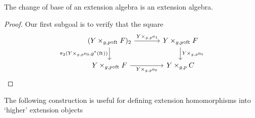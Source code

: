 \begin{thm}\label{cobesys-ext}
The change of base of an extension algebra is an extension algebra.
\end{thm}

\begin{proof}
Our first subgoal is to verify that the square
\begin{equation*}
\begin{tikzcd}[column sep=large]
(\pullback{Y}{\stesysf}{g}{p\circ\eft})_2
  \ar{r}{\cobesys{Y}{\efamext}{g}{p}} 
  \ar{d}[swap]{\pullbackpr{2}{\cobesys{Y}{\ectxext}{g}{p}}{g^\ast(\eft)}} 
  & 
\pullback{Y}{\stesysf}{g}{p\circ\eft}
  \ar{d}{\cobesys{Y}{\ectxext}{g}{p}}
  \\
\pullback{Y}{\stesysf}{g}{p\circ\eft}
  \ar{r}[swap]{\cobesys{Y}{\ectxext}{g}{p}} 
  & 
\pullback{Y}{\stesysc}{g}{p}
\end{tikzcd}
\end{equation*}
\end{proof}

The following construction is useful for defining extension homomorphisms into
`higher' extension objects

